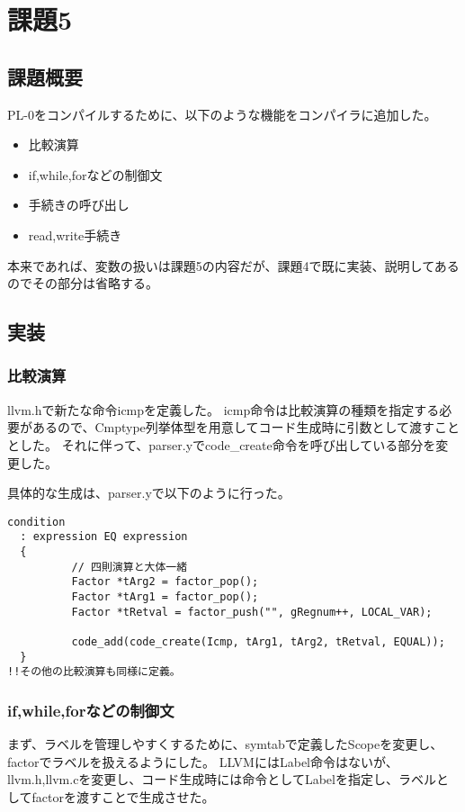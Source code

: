 \newpage
\section{課題5}
\subsection{課題概要}
PL-0をコンパイルするために、以下のような機能をコンパイラに追加した。
\begin{itemize}
  \item 比較演算
  \item if,while,forなどの制御文
  \item 手続きの呼び出し
  \item read,write手続き
\end{itemize}

本来であれば、変数の扱いは課題5の内容だが、課題4で既に実装、説明してあるのでその部分は省略する。

\subsection{実装}

\subsubsection{比較演算}
llvm.hで新たな命令icmpを定義した。
icmp命令は比較演算の種類を指定する必要があるので、Cmptype列挙体型を用意してコード生成時に引数として渡すこととした。
それに伴って、parser.yでcode\_create命令を呼び出している部分を変更した。

具体的な生成は、parser.yで以下のように行った。

\begin{lstlisting}[caption={condition},label={condition}]
  condition
  : expression EQ expression
  {
          // 四則演算と大体一緒
          Factor *tArg2 = factor_pop();
          Factor *tArg1 = factor_pop();
          Factor *tRetval = factor_push("", gRegnum++, LOCAL_VAR);

          code_add(code_create(Icmp, tArg1, tArg2, tRetval, EQUAL));
  }
!!その他の比較演算も同様に定義。
\end{lstlisting}

\subsubsection{if,while,forなどの制御文}
まず、ラベルを管理しやすくするために、symtabで定義したScopeを変更し、factorでラベルを扱えるようにした。
LLVMにはLabel命令はないが、llvm.h,llvm.cを変更し、コード生成時には命令としてLabelを指定し、ラベルとしてfactorを渡すことで生成させた。

